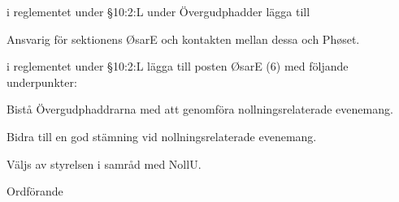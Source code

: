 \documentclass[../_main/handlingar.tex]{subfiles}
\begin{document}
\begin{attsatser}
    \att i reglementet under \S10:2:L under Övergudphadder lägga till
    \begin{dashlist}
        \item Ansvarig för sektionens ØsarE och kontakten mellan dessa och Phøset. 
    \end{dashlist}

    \att i reglementet under \S10:2:L lägga till posten ØsarE (6) med följande underpunkter:
    \begin{dashlist}
        \item Bistå Övergudphaddrarna med att genomföra nollningsrelaterade evenemang.
        \item Bidra till en god stämning vid nollningsrelaterade evenemang.
        \item Väljs av styrelsen i samråd med NollU.
    \end{dashlist}
\end{attsatser}

\begin{signatures}{1}
    \ist
    \signature{\ordf}{Ordförande}
\end{signatures}
\end{document}
